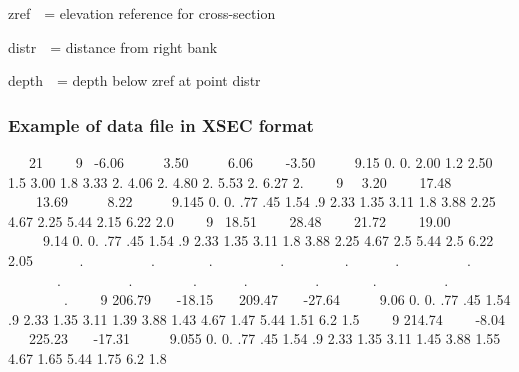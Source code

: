 \documentclass{article}
\begin{document}
zref\ \ = elevation reference for cross-section

distr\ \ = distance from right bank

depth\ \ = depth below zref at point distr


\bigskip

\subsubsection[Example of data file in XSEC format]{Example of data file in XSEC format}

\bigskip

\ \ \ 21 \ \ \ \ 9 \ {}-6.06 \ \ \ \ \ 3.50 \ \ \ \ \ 6.06 \ \ \ \ {}-3.50 \ \ \ \ \ 9.15 0. 0. 2.00 1.2 2.50 1.5 3.00 1.8 3.33 2. 4.06 2. 4.80 2. 5.53 2. 6.27 2. \ \ \ \ 9 \ \ 3.20 \ \ \ \ 17.48 \ \ \ \ 13.69 \ \ \ \ \ 8.22 \ \ \ \ \ 9.145 0. 0. .77 .45 1.54 .9 2.33 1.35 3.11 1.8 3.88 2.25 4.67 2.25 5.44 2.15 6.22 2.0 \ \ \ \ 9 \ 18.51 \ \ \ \ 28.48 \ \ \ \ 21.72 \ \ \ \ 19.00 \ \ \ \ \ 9.14 0. 0. .77 .45 1.54 .9 2.33 1.35 3.11 1.8 3.88 2.25 4.67 2.5 5.44 2.5 6.22 2.05 \ \ \ \ \ \ . \ \ \ \ \ \ \ \ \ . \ \ \ \ \ \ \ . \ \ \ \ \ \ \ \ \ . \ \ \ \ \ \ \ \ . \ \ \ \ \ \ . \ \ \ \ \ \ \ \ \ . \ \ \ \ \ \ \ . \ \ \ \ \ \ \ \ \ . \ \ \ \ \ \ \ \ . \ \ \ \ \ \ . \ \ \ \ \ \ \ \ \ . \ \ \ \ \ \ \ . \ \ \ \ \ \ \ \ \ . \ \ \ \ \ \ \ \ . \ \ \ \ 9 206.79 \ \ \ {}-18.15 \ \ \ 209.47 \ \ \ {}-27.64 \ \ \ \ \ 9.06 0. 0. .77 .45 1.54 .9 2.33 1.35 3.11 1.39 3.88 1.43 4.67 1.47 5.44 1.51 6.2 1.5 \ \ \ \ 9 214.74 \ \ \ \ {}-8.04 \ \ \ 225.23 \ \ \ {}-17.31 \ \ \ \ \ 9.055 0. 0. .77 .45 1.54 .9 2.33 1.35 3.11 1.45 3.88 1.55 
4.67 1.65 5.44 1.75 6.2 1.8
\end{document}

